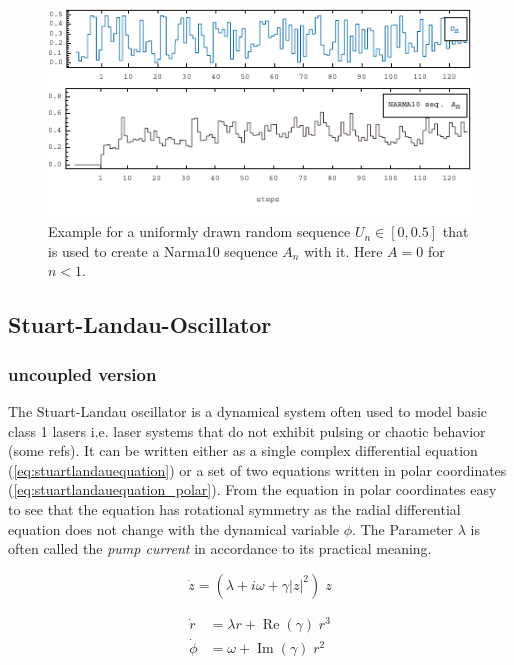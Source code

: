 \begin{figure}[h]
	\centering
	\includegraphics[width=13cm]{pics/narma_vis}
	\caption{Example for a uniformly drawn random sequence $U_n \in [0,0.5]$ that is used to create a Narma10 sequence $A_n$ with it. Here $A=0$ for $n<1$.}
	\label{fig:narma_vis}
\end{figure}
	
	
	

\subsection{Stuart-Landau-Oscillator}
	\subsubsection{uncoupled version}
	The Stuart-Landau oscillator is a dynamical system often used to model basic class 1 lasers i.e. laser systems that do not exhibit pulsing or chaotic behavior (some refs). It can be written either as a single complex differential equation (\ref{eq:stuartlandauequation}) or a set of two equations written in polar coordinates (\ref{eq:stuartlandauequation_polar}). From the equation in polar coordinates easy to see that the equation has rotational symmetry as the radial differential equation does not change with the dynamical variable $\phi$. The Parameter $\lambda$ is often called the \emph{pump current} in accordance to its practical meaning.

\begin{equation}	
	\dot{z} = (\lambda +  i \omega + \gamma |z|^2 ) \; z
	\label{eq:stuartlandauequation}		
\end{equation}

\begin{equation}
	\begin{split}
	\dot{r} & = \lambda r + \operatorname{Re} (\gamma) \; r^{3} \\
	\dot{\phi} &= \omega + \operatorname{Im}(\gamma) \; r^{2} 
	\end{split}
	\label{eq:stuartlandauequation_polar}
\end{equation}

